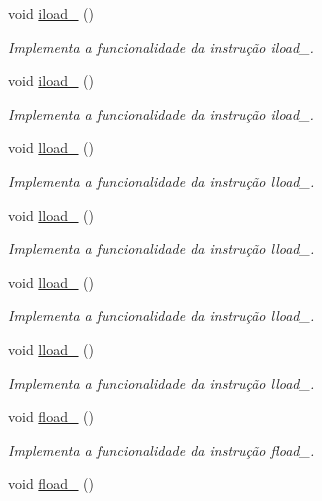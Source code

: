 \begin{DoxyCompactItemize}
void \hyperlink{classOperations_affa5afeadb98117ea0ee66cf2687eb0a}{iload\+\_} ()
\begin{DoxyCompactList}\small\item\em Implementa a funcionalidade da instrução iload\+\_. \end{DoxyCompactList}\item 
void \hyperlink{classOperations_a3f645534291129289ee71c708dbe633c}{iload\+\_} ()
\begin{DoxyCompactList}\small\item\em Implementa a funcionalidade da instrução iload\+\_. \end{DoxyCompactList}\item 
void \hyperlink{classOperations_a556b64c0764f7a654a30540eb355aab3}{lload\+\_} ()
\begin{DoxyCompactList}\small\item\em Implementa a funcionalidade da instrução lload\+\_. \end{DoxyCompactList}\item 
void \hyperlink{classOperations_a34e91f6520ca574abce6b2b30ce91948}{lload\+\_} ()
\begin{DoxyCompactList}\small\item\em Implementa a funcionalidade da instrução lload\+\_. \end{DoxyCompactList}\item 
void \hyperlink{classOperations_aa59772a5ed2bd59de3d54c635f294e93}{lload\+\_} ()
\begin{DoxyCompactList}\small\item\em Implementa a funcionalidade da instrução lload\+\_. \end{DoxyCompactList}\item 
void \hyperlink{classOperations_af2f8b1e41b734f43e73d9d6811eb427b}{lload\+\_} ()
\begin{DoxyCompactList}\small\item\em Implementa a funcionalidade da instrução lload\+\_. \end{DoxyCompactList}\item 
void \hyperlink{classOperations_a844c8a8d812c4f78c8f1024bbdac0548}{fload\+\_} ()
\begin{DoxyCompactList}\small\item\em Implementa a funcionalidade da instrução fload\+\_. \end{DoxyCompactList}\item 
void \hyperlink{classOperations_a71611bd9fa43e8e170a35f3a5e1f0572}{fload\+\_} ()

\end{DoxyCompactItemize}
